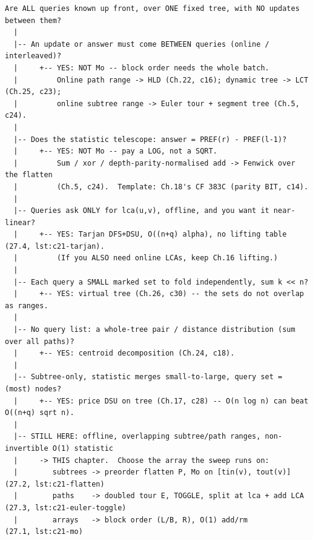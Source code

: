 \begin{lstlisting}[language={}, basicstyle=\ttfamily\small, numbers=none, frame=single]
  Are ALL queries known up front, over ONE fixed tree, with NO updates between them?
  |
  |-- An update or answer must come BETWEEN queries (online / interleaved)?
  |     +-- YES: NOT Mo -- block order needs the whole batch.
  |         Online path range -> HLD (Ch.22, c16); dynamic tree -> LCT (Ch.25, c23);
  |         online subtree range -> Euler tour + segment tree (Ch.5, c24).
  |
  |-- Does the statistic telescope: answer = PREF(r) - PREF(l-1)?
  |     +-- YES: NOT Mo -- pay a LOG, not a SQRT.
  |         Sum / xor / depth-parity-normalised add -> Fenwick over the flatten
  |         (Ch.5, c24).  Template: Ch.18's CF 383C (parity BIT, c14).
  |
  |-- Queries ask ONLY for lca(u,v), offline, and you want it near-linear?
  |     +-- YES: Tarjan DFS+DSU, O((n+q) alpha), no lifting table (27.4, lst:c21-tarjan).
  |         (If you ALSO need online LCAs, keep Ch.16 lifting.)
  |
  |-- Each query a SMALL marked set to fold independently, sum k << n?
  |     +-- YES: virtual tree (Ch.26, c30) -- the sets do not overlap as ranges.
  |
  |-- No query list: a whole-tree pair / distance distribution (sum over all paths)?
  |     +-- YES: centroid decomposition (Ch.24, c18).
  |
  |-- Subtree-only, statistic merges small-to-large, query set = (most) nodes?
  |     +-- YES: price DSU on tree (Ch.17, c28) -- O(n log n) can beat O((n+q) sqrt n).
  |
  |-- STILL HERE: offline, overlapping subtree/path ranges, non-invertible O(1) statistic
  |     -> THIS chapter.  Choose the array the sweep runs on:
  |        subtrees -> preorder flatten P, Mo on [tin(v), tout(v)]       (27.2, lst:c21-flatten)
  |        paths    -> doubled tour E, TOGGLE, split at lca + add LCA    (27.3, lst:c21-euler-toggle)
  |        arrays   -> block order (L/B, R), O(1) add/rm                 (27.1, lst:c21-mo)
\end{lstlisting}


